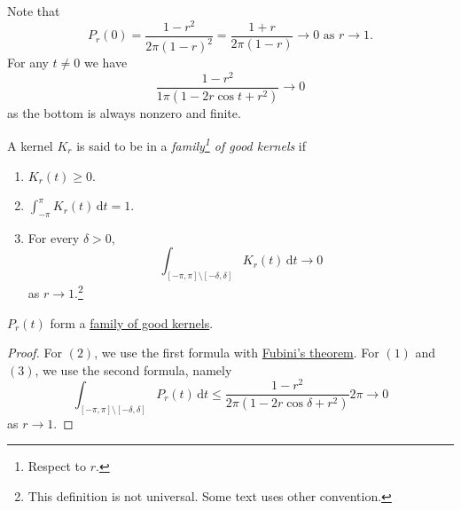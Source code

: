 \begin{note}
	Note that
	\[
		P_r(0)= \frac{1-r^{2} }{2\pi (1 - r)^{2} } = \frac{1 + r}{2\pi (1 - r)} \to 0 \text{ as }r \to 1.
	\]
	For any \(t\neq 0\) we have
	\[
		\frac{1-r^{2} }{1\pi (1 - 2r \cos t + r^{2} )}\to 0
	\]
	as the bottom is always nonzero and finite.
\end{note}

\begin{definition}\label{def:good-kernel}
	A kernel \(K_r\) is said to be in a \emph{family\footnote{Respect to \(r\).} of good kernels} if
	\begin{enumerate}[(1)]
		\item \(K_r(t) \geq 0\).
		\item \(\int _{-\pi }^\pi K_r(t)\,\mathrm{d} t = 1\).
		\item For every \(\delta >0\),
		      \[
			      \int _{[-\pi , \pi ]\setminus [-\delta , \delta ]}K_{r} (t) \,\mathrm{d} t \to 0
		      \]
		      as \(r \to 1\).\footnote{This definition is not universal. Some text uses other convention.}
	\end{enumerate}
\end{definition}

\begin{lemma}
	\(P_r(t)\) form a \hyperref[def:good-kernel]{family of good kernels}.
\end{lemma}
\begin{proof}
	For \((2)\), we use the first formula with \hyperref[thm:Fubini-theorem]{Fubini's theorem}. For \((1)\) and \((3)\), we use the second formula, namely
	\[
		\int _{[-\pi , \pi ]\setminus [-\delta , \delta ]}P_r(t)\,\mathrm{d} t \leq \frac{1 - r^{2} }{2\pi (1 - 2r \cos \delta  + r^{2} )}2\pi \to 0
	\]
	as \(r \to 1\).
\end{proof}

